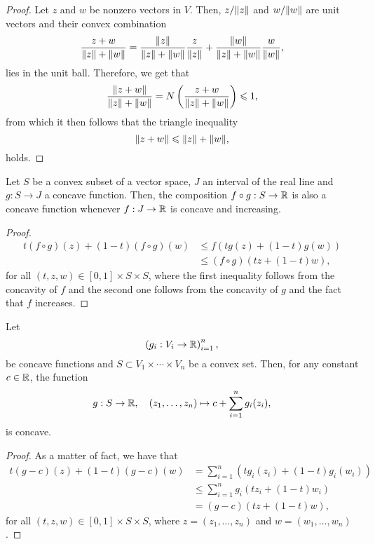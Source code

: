 \begin{proof}
  Let \(z\) and \(w\) be nonzero vectors in \(V\). Then, \(z/\norm(z)\) and
  \(w/\norm(w)\) are unit vectors and their convex combination
  \[
    \frac{z+w}{\norm(z)+\norm(w)}
    =
    \frac{\norm(z)}{\norm(z)+\norm(w)}\frac{z}{\norm(z)}
    +
    \frac{\norm(w)}{\norm(z)+\norm(w)}\frac{w}{\norm(w)}
    ,
  \]
  lies in the unit ball. Therefore, we get that
  \[
    \frac{\norm(z+w)}{\norm(z)+\norm(w)}
    =
    N\left(\frac{z+w}{\norm(z)+\norm(w)}\right)\leqslant{1},
  \]
  from which it then follows that the triangle inequality
  \[
    \norm(z+w)\leqslant{\norm(z)+\norm(w)},
  \]
  holds.
\end{proof}

\begin{lemma}\label{lemma:concavity-of-compositions-of-concave-functions}
  Let \(S\) be a convex subset of a vector space, \(J\) an interval of the real
  line and \(g:S\to{J}\) a concave function. Then, the composition
  \(f\circ{g}:S\to\mathbb{R}\) is also a concave function whenever \(f:J\to\mathbb{R}\)
  is concave and increasing.
\end{lemma}

\begin{proof}
  \begin{align*}
    t(f\circ{g})(z)+(1-t)(f\circ{g})(w)
    &\leqslant{f(tg(z)+(1-t)g(w))}\\
    &\leqslant{(f\circ{g})(tz+(1-t)w)},
  \end{align*}
  for all \((t,z,w)\in{[0,1]\times{S}\times{S}}\), where the first inequality
  follows from the concavity of \(f\) and the second one follows from the
  concavity of \(g\) and the fact that \(f\) increases.
\end{proof}

\begin{lemma}\label{lemma:concavity-of-sums-of-concave-functions}
  Let
  \[
    \left(g_{i}:V_{i}\to\mathbb{R}\right)_{i=1}^{n},
  \]
  be concave functions and \(S\subset{V_{1}\times\cdots\times{V_{n}}}\) be a
  convex set. Then, for any constant \(c\in\mathbb{R}\), the function
  \[
    g:S\to\mathbb{R},\quad{(z_{1},\ldots,z_{n})\mapsto{c+\sum_{i=1}^{n}g_{i}(z_{i})}},
  \]
  is concave.
\end{lemma}

\begin{proof}
  As a matter of fact, we have that
  \begin{align*}
    t(g-c)(z)+(1-t)(g-c)(w)
    &=
    \sum_{i=1}^{n}\left(tg_{i}(z_{i})+(1-t)g_{i}(w_{i})\right)
    \\
    &\leqslant
    \sum_{i=1}^{n}g_{i}\left(tz_{i}+(1-t)w_{i}\right)
    \\
    &=
    (g-c)\left(tz+(1-t)w\right),
  \end{align*}
  for all \((t,z,w)\in{[0,1]\times{S}\times{S}}\), where
  \(z=(z_{1},\ldots,z_{n})\) and \(w=(w_{1},\ldots,w_{n})\).
\end{proof}

